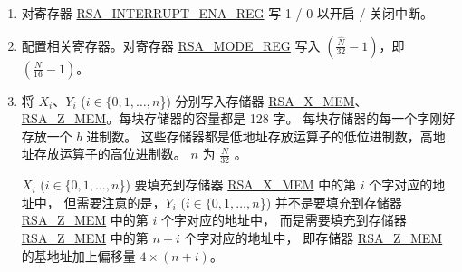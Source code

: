 \documentclass[main\_\_CN.tex]{subfiles}
\begin{document}
\begin{enumerate}

    \item 对寄存器 \hyperref[regdesc:RSAINTERRUPTENAREG]{RSA\_INTERRUPT\_ENA\_REG} 写 1 / 0 以开启 / 关闭中断。

    \item 配置相关寄存器。对寄存器 \hyperref[regdesc:RSAMODEREG]{RSA\_MODE\_REG} 写入 \begin{math}( \frac{\hat{N}}{32} - 1 )\end{math}，即 \begin{math}(  \frac{N}{16} - 1 )\end{math}。

    \item 将 \begin{math}{X}_{i}\end{math}、\begin{math}{Y}_{i}\end{math} (\begin{math}i \in \{ 0, 1, \dots, n \end{math}\}) 分别写入存储器 \hyperref[regdesc:RSAmemory]{RSA\_X\_MEM}、\hyperref[regdesc:RSAmemory]{RSA\_Z\_MEM}。每块存储器的容量都是 128 字。
        每块存储器的每一个字刚好存放一个 \begin{math}b\end{math} 进制数。
        这些存储器都是低地址存放运算子的低位进制数，高地址存放运算子的高位进制数。
        \begin{math}n\end{math} 为 \begin{math} \frac{N}{32} \end{math} 。

         \begin{math}{X}_{i}\end{math} (\begin{math}i \in \{ 0, 1, \dots, n \end{math}\}) 要填充到存储器 \hyperref[regdesc:RSAmemory]{RSA\_X\_MEM} 中的第 \begin{math}i\end{math} 个字对应的地址中，
        但需要注意的是，\begin{math}{Y}_{i}\end{math} (\begin{math}i\in\{ 0, 1, \dots, n \end{math}\}) 并不是要填充到存储器 \hyperref[regdesc:RSAmemory]{RSA\_Z\_MEM} 中的第 \begin{math}i\end{math} 个字对应的地址中，
        而是需要填充到存储器 \hyperref[regdesc:RSAmemory]{RSA\_Z\_MEM} 中的第 \begin{math}n+i\end{math} 个字对应的地址中，
        即存储器 \hyperref[regdesc:RSAmemory]{RSA\_Z\_MEM} 的基地址加上偏移量 \begin{math}4 \times (n+i) \end{math}。


\end{enumerate}
\end{document}
